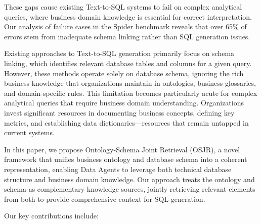 \documentclass[sigconf, nonatbib]{acmart}
\begin{document}
These gaps cause existing Text-to-SQL systems to fail on complex analytical queries, where business domain knowledge is essential for correct interpretation. Our analysis of failure cases in the Spider benchmark reveals that over 65\% of errors stem from inadequate schema linking rather than SQL generation issues.

Existing approaches to Text-to-SQL generation primarily focus on schema linking, which identifies relevant database tables and columns for a given query. However, these methods operate solely on database schema, ignoring the rich business knowledge that organizations maintain in ontologies, business glossaries, and domain-specific rules. This limitation becomes particularly acute for complex analytical queries that require business domain understanding. Organizations invest significant resources in documenting business concepts, defining key metrics, and establishing data dictionaries---resources that remain untapped in current systems.

In this paper, we propose Ontology-Schema Joint Retrieval (OSJR), a novel framework that unifies business ontology and database schema into a coherent representation, enabling Data Agents to leverage both technical database structure and business domain knowledge. Our approach treats the ontology and schema as complementary knowledge sources, jointly retrieving relevant elements from both to provide comprehensive context for SQL generation.

Our key contributions include:
\end{document}
